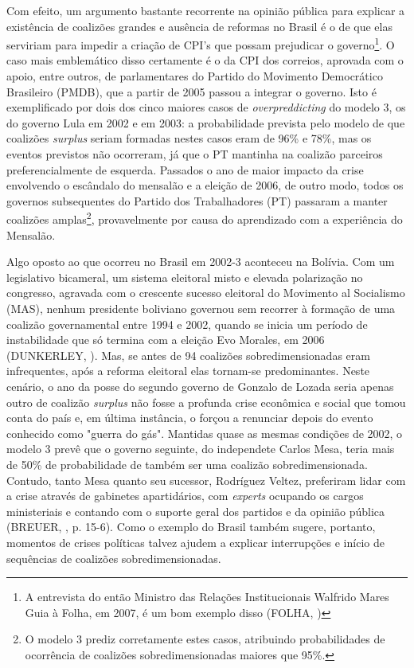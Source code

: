 Com efeito, um argumento bastante recorrente na opinião pública para explicar a existência de coalizões grandes e ausência de reformas no Brasil é o de que elas serviriam para impedir a criação de CPI's que possam prejudicar o governo\footnote{A entrevista do então Ministro das Relações Institucionais Walfrido Mares Guia à Folha, em 2007, é um bom exemplo disso (FOLHA, \citeyear{folha2007})}. O caso mais emblemático disso certamente é o da CPI dos correios, aprovada com o apoio, entre outros, de parlamentares do Partido do Movimento Democrático Brasileiro (PMDB), que a partir de 2005 passou a integrar o governo. Isto é exemplificado por dois dos cinco maiores casos de \textit{overpreddicting} do modelo 3, os do governo Lula em 2002 e em 2003: a probabilidade prevista pelo modelo de que coalizões \textit{surplus} seriam formadas nestes casos eram de 96\% e 78\%, mas os eventos previstos não ocorreram, já que o PT mantinha na coalizão parceiros preferencialmente de esquerda. Passados o ano de maior impacto da crise envolvendo o escândalo do mensalão e a eleição de 2006, de outro modo, todos os governos subsequentes do Partido dos Trabalhadores (PT) passaram a manter coalizões amplas\footnote{O modelo 3 prediz corretamente estes casos, atribuindo probabilidades de ocorrência de coalizões sobredimensionadas maiores que 95\%.}, provavelmente por causa do aprendizado com a experiência do Mensalão.

Algo oposto ao que ocorreu no Brasil em 2002-3 aconteceu na Bolívia. Com um legislativo bicameral, um sistema eleitoral misto e elevada polarização no congresso, agravada com o crescente sucesso eleitoral do Movimento al Socialismo (MAS), nenhum presidente boliviano governou sem recorrer à formação de uma coalizão governamental entre 1994 e 2002, quando se inicia um período de instabilidade que só termina com a eleição Evo Morales, em 2006 (DUNKERLEY, \citeyear{dunkerley2007}). Mas, se antes de 94 coalizões sobredimensionadas eram infrequentes, após a reforma eleitoral elas tornam-se predominantes. Neste cenário, o ano da posse do segundo governo de Gonzalo de Lozada seria apenas outro de coalizão \textit{surplus} não fosse a profunda crise econômica e social que tomou conta do país e, em última instância, o forçou a renunciar depois do evento conhecido como "guerra do gás". Mantidas quase as mesmas condições de 2002, o modelo 3 prevê que o governo seguinte, do independete Carlos Mesa, teria mais de 50\% de probabilidade de também ser uma coalizão sobredimensionada. Contudo, tanto Mesa quanto seu sucessor, Rodríguez Veltez, preferiram lidar com a crise através de gabinetes apartidários, com \textit{experts} ocupando os cargos ministeriais e contando com o suporte geral dos partidos e da opinião pública (BREUER, \citeyear{breuer2008}, p. 15-6). Como o exemplo do Brasil também sugere, portanto, momentos de crises políticas talvez ajudem a explicar interrupções e início de sequências de coalizões sobredimensionadas.


